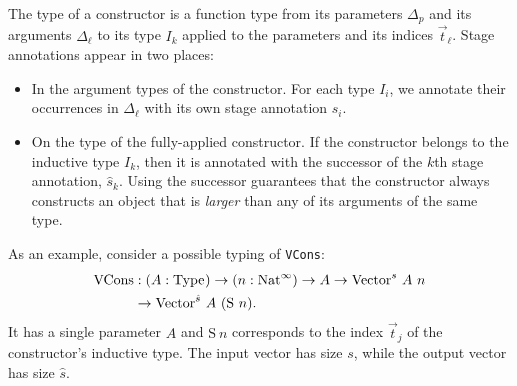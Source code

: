 \documentclass[sigplan,10pt,anonymous,review,nonacm]{acmart}
\begin{document}
The type of a constructor is a function type from its parameters $\Delta_p$ and its arguments $\Delta_\ell$ to its \coinductive type $I_k$ applied to the parameters and its indices $\vec{t}_\ell$. Stage annotations appear in two places:
\begin{itemize}
    \item In the argument types of the constructor. For each \coinductive type $I_i$, we annotate their occurrences in $\Delta_\ell$ with its own stage annotation $s_i$.
    \item On the \coinductive type of the fully-applied constructor. If the constructor belongs to the inductive type $I_k$, then it is annotated with the successor of the $k$th stage annotation, $\hat{s}_k$. Using the successor guarantees that the constructor always constructs an object that is \textit{larger} than any of its arguments of the same type.
\end{itemize}
As an example, consider a possible typing of \texttt{VCons}:
\begin{align*}
\text{VCons} &: (A: \text{Type}_{}) \to (n:\text{Nat}^\infty) \to A \to \text{Vector}^s\ A\ n \\
&\to \text{Vector}^{\hat{s}}\ A\ (\text{S}\ n).
\end{align*}
It has a single parameter $A$ and $\text{S}\ n$ corresponds to the index $\vec{t}_j$ of the constructor's inductive type. The input vector has size $s$, while the output vector has size $\hat{s}$.
\end{document}
